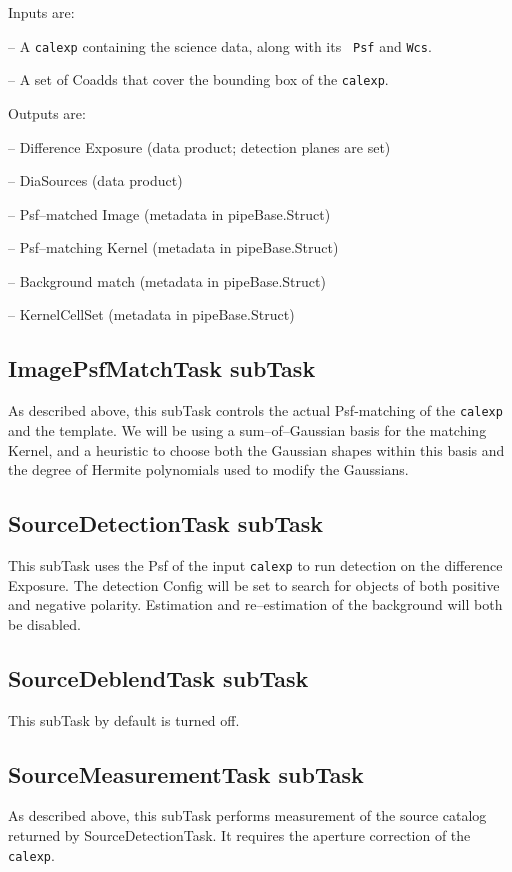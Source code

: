 \documentclass[12pt]{article}
\begin{document}
Inputs are:

-- A {\tt calexp} containing the science data, along with its {\tt
  Psf} and {\tt Wcs}.

-- A set of Coadds that cover the bounding box of the {\tt calexp}.

Outputs are:

-- Difference Exposure (data product; detection planes are set)

-- DiaSources (data product)

-- Psf--matched Image (metadata in pipeBase.Struct)

-- Psf--matching Kernel (metadata in pipeBase.Struct)

-- Background match (metadata in pipeBase.Struct)

-- KernelCellSet (metadata in pipeBase.Struct)

\subsection{ImagePsfMatchTask subTask}
As described above, this subTask controls the actual Psf-matching of
the {\tt calexp} and the template.  We will be using a
sum--of--Gaussian basis for the matching Kernel, and a heuristic to
choose both the Gaussian shapes within this basis and the degree of
Hermite polynomials used to modify the Gaussians.

\subsection{SourceDetectionTask subTask}
This subTask uses the Psf of the input {\tt calexp} to run detection
on the difference Exposure.  The detection Config will be set to
search for objects of both positive and negative polarity.  Estimation
and re--estimation of the background will both be disabled.

\subsection{SourceDeblendTask subTask}
This subTask by default is turned off.

\subsection{SourceMeasurementTask subTask}
As described above, this subTask performs measurement of the source
catalog returned by SourceDetectionTask.  It requires the aperture
correction of the {\tt calexp}.
\end{document}
